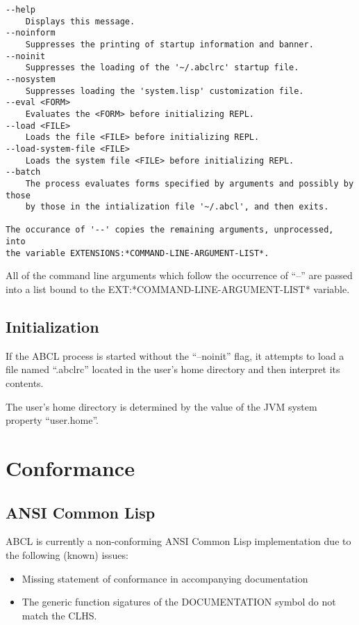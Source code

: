 \documentclass[10pt]{book}
\begin{document}
\begin{verbatim}
--help
    Displays this message.
--noinform
    Suppresses the printing of startup information and banner.
--noinit
    Suppresses the loading of the '~/.abclrc' startup file.
--nosystem
    Suppresses loading the 'system.lisp' customization file. 
--eval <FORM>
    Evaluates the <FORM> before initializing REPL.
--load <FILE>
    Loads the file <FILE> before initializing REPL.
--load-system-file <FILE>
    Loads the system file <FILE> before initializing REPL.
--batch
    The process evaluates forms specified by arguments and possibly by those
    by those in the intialization file '~/.abcl', and then exits.

The occurance of '--' copies the remaining arguments, unprocessed, into
the variable EXTENSIONS:*COMMAND-LINE-ARGUMENT-LIST*.
\end{verbatim}

All of the command line arguments which follow the occurrence of ``--''
are passed into a list bound to the EXT:*COMMAND-LINE-ARGUMENT-LIST*
variable.

\section{Initialization}

If the ABCL process is started without the ``--noinit'' flag, it
attempts to load a file named ``.abclrc'' located in the user's home
directory and then interpret its contents.  

The user's home directory is determined by the value of the JVM system
property ``user.home''.

\chapter{Conformance}

\section{ANSI Common Lisp}
ABCL is currently a non-conforming ANSI Common Lisp implementation due
to the following (known) issues:

\begin{itemize}
  \item Missing statement of conformance in accompanying documentation
  \item The generic function sigatures of the DOCUMENTATION symbol do
    not match the CLHS.
\end{itemize}
\end{document}
